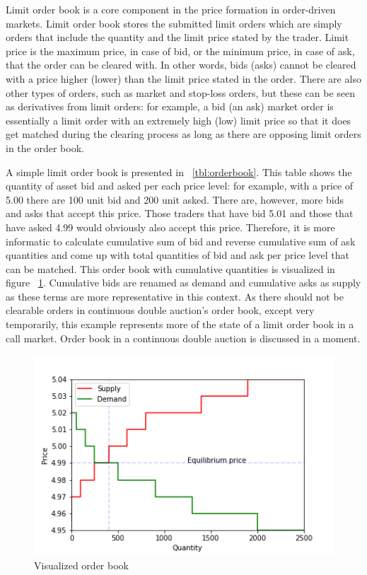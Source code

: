 Limit order book is a core component in the price formation in order-driven markets.
Limit order book stores the submitted limit orders which are simply orders that include the quantity and 
the limit price stated by the trader. Limit price is the maximum price, in case of bid, or the minimum
price, in case of ask, that the order can be cleared with. In other words,
bids (asks) cannot be cleared with a price higher (lower) than the limit price stated 
in the order. There are also other types of orders, such as market and 
stop-loss orders, but these can be seen as derivatives from limit orders: 
for example, a bid (an ask) market order is essentially a limit order 
with an extremely high (low) limit price so that it does get matched 
during the clearing process as long as there are opposing limit orders in the 
order book. \citep{lob13} %

A simple limit order book is presented in ~\ref{tbl:orderbook}. This table shows the
quantity of asset bid and asked per each price level: for example, with a price of 5.00
there are 100 unit bid and 200 unit asked. There are, however, more bids and asks that 
accept this price. Those traders that have bid 5.01 and those that have asked 4.99 would obviously also accept
this price. Therefore, it is more informatic to calculate cumulative sum of bid and reverse cumulative sum of 
ask quantities and come up with total quantities of bid and ask per price level that can be matched.  
This order book with cumulative quantities is visualized in figure ~\ref{fig:lob_visual}. Cumulative bids
are renamed as demand and cumulative asks as supply as these terms are more representative in this context.
As there should not be clearable orders in continuous double auction's order book, except very temporarily, 
this example represents more of the state of a limit order book in a call market. Order book
in a continuous double auction is discussed in a moment.

\begin{figure}
    \begin{center}  
        \includegraphics{plots/orderbook_visualized.png}
        \caption{Visualized order book}
        \label{fig:lob_visual}
    \end{center}
\end{figure}

